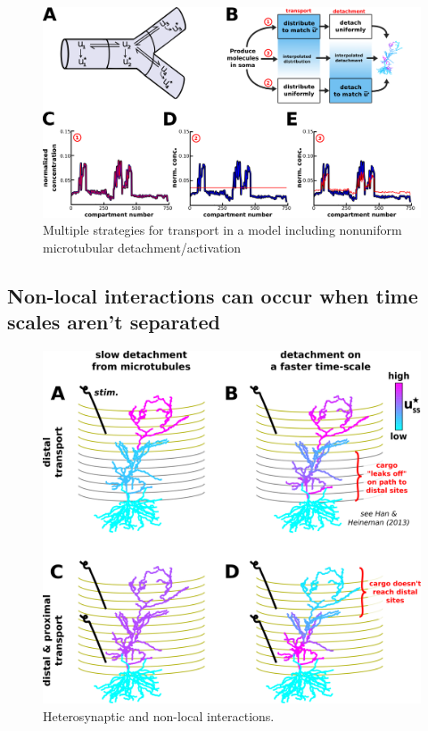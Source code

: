 \documentclass[fleqn,10pt]{wlpeerj}
\begin{document}
\begin{figure}[h!]
\begin{center}
\includegraphics[width=1\columnwidth]{Fig3.png}
\caption{Multiple strategies for transport in a model including nonuniform microtubular detachment/activation}
\end{center}
\end{figure}

\subsection*{Non-local interactions can occur when time scales aren't separated}

\begin{figure}[h!]
\begin{center}
\includegraphics[width=0.7\columnwidth]{05_heterosynaptic.png}
\caption{Heterosynaptic and non-local interactions.
}
\end{center}
\end{figure}
\end{document}
